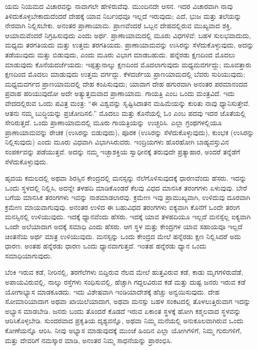 ಯಮ ನಿಯಮದ ವಿಚಾರವನ್ನು ನಾವಾಗಲೇ ಹೇಳಿರುವೆವು. ಮುಂದಿನದೇ ಆಸನ. ಇದರ ವಿಚಾರವಾಗಿ ನಾವು ತಿಳಿದುಕೊಳ್ಳಬೇಕಾದುದೆಂದರೆ ದೇಹಕ್ಕೆ ಯಾವ ನಿರ್ಬಂಧವೂ ಇಲ್ಲದೆ ಇರುವುದು; ಎದೆ, ಭುಜ ಮತ್ತು ತಲೆಯನ್ನು ನೇರವಾಗಿ ನಿಲ್ಲಿಸಬೇಕು. ಅನಂತರ ಪ್ರಾಣಾಯಾಮ. ಪ್ರಾಣವೆಂದರೆ ಒಬ್ಬನ ದೇಹದಲ್ಲಿರುವ ಮುಖ್ಯವಾದ ಶಕ್ತಿ, ಆಯಾಮವೆಂದರೆ ನಿಗ್ರಹಿಸುವುದು ಎಂದು ಅರ್ಥ. ಪ್ರಾಣಾಯಾಮದಲ್ಲಿ ಮೂರು ವಿಧಗಳಿವೆ: ಬಹಳ ಸುಲಭವಾದುದು, ಮಧ್ಯಮ ತರಗತಿಯದು ಮತ್ತು ಉತ್ತಮ ತರಗತಿಯದು. ಪ್ರಾಣಾಯಾಮವನ್ನು ಉಸಿರನ್ನು ಸೆಳೆದುಕೊಳ್ಳುವುದು, ಅದನ್ನು ತಡೆಯುವುದು ಮತ್ತು ಬಿಡುವುದು, ಎಂದು ಮೂರು ವಿಭಾಗ ಮಾಡಬಹುದು. ಹನ್ನೆರಡು ಕ್ಷಣದಿಂದ ಮೊದಲು ಮಾಡುವುದು ಕೊನೆಯದರ್ಜೆಯದು: ಇಪ್ಪತ್ತುನಾಲ್ಕು ಕ್ಷಣದಿಂದ ಮೊದಲಾಗುವುದು ಮಧ್ಯಮವರ್ಗದ್ದು; ಮೂವತ್ತಾರು ಕ್ಷಣದಿಂದ ಮೊದಲು ಮಾಡುವುದು ಉತ್ತಮ ವರ್ಗದ್ದು. ಕೆಳದರ್ಜೆಯ ಪ್ರಾಣಯಾಮದಲ್ಲಿ ಬೆವರು ಸುರಿಯುವುದು; ಮಧ್ಯಮವರ್ಗದ ಪ್ರಾಣಯಾಮದಲ್ಲಿ ದೇಹ ಕಂಪಿಸುವುದು; ಯಾವಾಗ ದೇಹ ಹಗುರವಾಗಿ ಅನಂತರ ಪರಮಾನಂದದ ಪ್ರವಾಹ ಹರಿಯುವುದೋ ಅದೇ ಅತ್ಯುತ್ತಮವಾದ ಪ್ರಾಣಾಯಾಮ. ಗಾಯತ್ರಿ ಎಂಬ ಒಂದು ಮಂತ್ರವಿದೆ. ಇದು ವೇದದಲ್ಲಿರುವ ಒಂದು ಪವಿತ್ರ ಮಂತ್ರ: “ಈ ವಿಶ್ವವನ್ನು ಸೃಷ್ಟಿಸಿದಾತನ ಮಹಿಮೆಯನ್ನು ಕುರಿತು ನಾವು ಧ್ಯಾನಿಸುತ್ತೇವೆ. ಆತನು ನಮ್ಮ ಬುದ್ಧಿಯನ್ನು ಪ್ರಚೋದಿಸಲಿ.” ಮೊದಲು ಮತ್ತು ಕೊನೆಯಲ್ಲಿ ಓಂ ಎಂಬ ಪದವು ಇದರ ಜೊತೆಯಲ್ಲಿ ಸೇರಿರುತ್ತದೆ. ಒಂದು ಪ್ರಾಣಾಯಾಮದಲ್ಲಿ ಮೂರು ಗಾಯತ್ರಿಯನ್ನು\break\ ಉಚ್ಚರಿಸಿ. ಎಲ್ಲಾ ಗ್ರಂಥಗಳಲ್ಲಿಯೂ ಪ್ರಾಣಾಯಾಮವನ್ನು ರೇಚಕ (ಉಸಿರನ್ನು ಬಿಡುವುದು), ಪೂರಕ (ಉಸಿರನ್ನು ಸೆಳೆದುಕೊಳ್ಳುವುದು), ಕುಂಭಕ (ಉಸಿರನ್ನು ನಿಲ್ಲಿಸುವುದು) ಎಂದು ಮೂರು ವಿಧವಾಗಿ ವಿಭಾಗಿಸಿರುವರು. ಇಂದ್ರಿಯಗಳು ಹೊರಹೋಗಿ ಬಾಹ್ಯವಸ್ತುವಿನ ಸಂಪರ್ಕವನ್ನು ಪಡೆಯುತ್ತವೆ. ಅದನ್ನು ನಮ್ಮ ಇಚ್ಛಾಶಕ್ತಿಯ ಸ್ವಾಧೀನಕ್ಕೆ ತರುವುದೇ ಪ್ರತ್ಯಾಹಾರ, ಅಂದರೆ ತನ್ನೆಡೆಗೆ ಸೆಳೆದುಕೊಳ್ಳುವುದು. 

ಹೃದಯ ಕಮಲದಲ್ಲಿ ಅಥವಾ ಶಿರಸ್ಸಿನ ಕೇಂದ್ರದಲ್ಲಿ ಮನಸ್ಸನ್ನು ನೆಲೆಗೊಳಿಸುವುದಕ್ಕೆ ಧಾರಣವೆಂದು ಹೆಸರು. ಇದನ್ನು ಒಂದು ಸ್ಥಳದಲ್ಲಿ ನಿಲ್ಲಿಸಿ, ಅದನ್ನೇ ತಳಹದಿ ಮಾಡಿಕೊಂಡರೆ ಕೆಲವು ವಿಧದ ಮಾನಸಿಕ ತರಂಗಗಳು ಏಳುವುವು. ಬೇರೆ ಬಗೆಯ ಮಾನಸಿಕ ತರಂಗಗಳು ಇವನ್ನು ನಾಶಮಾಡಲಾರವು. ಕ್ರಮೇಣ ಇವು ಪ್ರಾಮುಖ್ಯವಾಗಿ, ಉಳಿದುವು ದೂರವಾಗಿ ಕ್ರಮೇಣ ಮಾಯವಾಗುವುವು. ಅನಂತರ ಉಳಿದ ಈ ಬಹುವಿಧದ ತರಂಗಗಳು ಐಕ್ಯವಾಗಿ ಕೊನೆಗೆ ಒಂದೇ ತರಂಗ ಮನಸ್ಸಿನಲ್ಲಿ ಉಳಿಯುವುದು. ಇದಕ್ಕೆ ಧ್ಯಾನವೆಂದು ಹೆಸರು. ಇದಕ್ಕೆ ಯಾವ ತಳಹದಿಯೂ ಇಲ್ಲದೆ ಮನಸ್ಸೆಲ್ಲ ಐಕ್ಯವಾಗಿ ಒಂದೇ ಅಲೆಯಾದಾಗ ಅದಕ್ಕೆ ಸಮಾಧಿ ಎಂದು ಹೆಸರು. ಆಗ ಸ್ಥಳ ಮತ್ತು ಕೇಂದ್ರಗಳ ಯಾವ ಸಹಾಯವೂ ಇಲ್ಲದೆ ಚಿಂತನೆಯ ಅರ್ಥ ಮಾತ್ರ ಉಳಿಯುವುದು. ಮನಸ್ಸನ್ನು ಒಂದು ಕೇಂದ್ರದ ಮೇಲೆ ಹನ್ನೆರಡು ಕ್ಷಣ ನಿಲ್ಲಿಸಿದರೆ ಅದು ಧಾರಣ. ಅಂತಹ ಹನ್ನೆರಡು ಧಾರಣ ಒಂದು ಧ್ಯಾನವಾಗುತ್ತದೆ. ಇಂತಹ ಹನ್ನೆರಡು ಧ್ಯಾನ ಒಂದು ಸಮಾಧಿಯಾಗುವುದು. 

ಬೆಂಕಿ ಇರುವ ಕಡೆ, ನೀರಿನಲ್ಲಿ, ತರಗೆಲೆಗಳು ಬಿದ್ದಿರುವ ನೆಲದ ಮೇಲೆ ಹುತ್ತವಿರುವ ಕಡೆ, ಕಾಡು ಮೃಗಗಳಿರುವೆಡೆ, ಅಪಾಯವಿರುವಲ್ಲಿ, ನಾಲ್ಕು ರಸ್ತೆಗಳು ಸಂಧಿಸುವಲ್ಲಿ, ಹೆಚ್ಚಾಗಿ ಗದ್ದಲವಿರುವ ಕಡೆ ಮತ್ತು ದುಷ್ಟ ಜನರು ಇರುವ ಕಡೆ ಯೋಗಾಭ್ಯಾಸ ಮಾಡಕೂಡದು. ಇದು ವಿಶೇಷವಾಗಿ ಇಂಡಿಯಾದೇಶಕ್ಕೆ ಹೆಚ್ಚು ಅನ್ವಯಿಸುವುದು. ದೇಹ ಸೋಮಾರಿಯಾದಾಗ ಅಥವಾ ಖಾಯಿಲೆಯಾದಾಗ, ಅಥವಾ ಮನಸ್ಸು ಬಹಳ ಸಂಕಟದಲ್ಲಿ ತೊಳಲುತ್ತಿರುವಾಗ ಇದನ್ನು ಅಭ್ಯಾಸ ಮಾಡಬೇಡಿ. ಜನರು ಬಂದು ತೊಂದರೆ ಕೊಡದೆ ಇರುವ ಏಕಾಂತ ಸ್ಥಳಕ್ಕೆ ಹೋಗಿ ಕಶ್ಮಲವಾದ ಸ್ಥಳವನ್ನು ಆರಿಸಿಕೊಳ್ಳಬೇಡಿ. ಸುಂದರವಾದ ಪ್ರಕೃತಿಯ ದೃಶ್ಯವನ್ನೊ, ಅಥವಾ ನಿಮ್ಮ ಮನೆಯಲ್ಲಿ ಅನುಕೂಲವಾಗಿರುವ ಒಂದು ಕೋಣೆಯನ್ನೊ ಆರಿಸಿ. ನೀವು ಅಭ್ಯಾಸ ಮಾಡುವುದಕ್ಕೆ ಮುಂಚೆ ಹಿಂದಿನ ಎಲ್ಲಾ ಯೋಗಿಗಳಿಗೆ, ನಿಮ್ಮ ಗುರುಗಳಿಗೆ, ಮತ್ತು ದೇವರಿಗೆ ನಮಸ್ಕಾರ ಮಾಡಿ, ಅನಂತರ ನಿಮ್ಮ ಸಾಧನೆಯನ್ನು ಪ್ರಾರಂಭಿಸಿ. 

